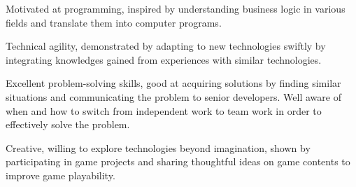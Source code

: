 

\begin{cvlist}
	\item Motivated at programming, inspired by understanding business logic in various fields and translate them into computer programs.
	\item Technical agility, demonstrated by adapting to new technologies swiftly by integrating knowledges gained from experiences with similar technologies.
	\item Excellent problem-solving skills, good at acquiring solutions by finding similar situations and communicating the problem to senior developers. Well aware of when and how to switch from independent work to team work in order to effectively solve the problem.
	\item Creative, willing to explore technologies beyond imagination, shown by participating in game projects and sharing thoughtful ideas on game contents to improve game playability.
\end{cvlist}


